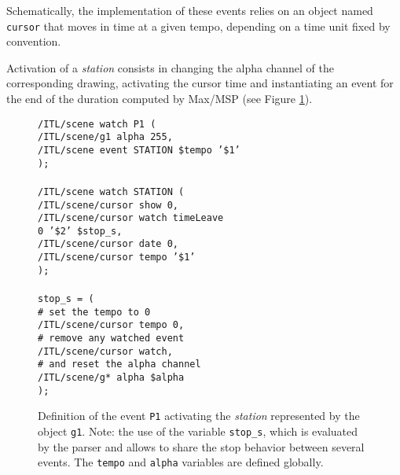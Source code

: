 \documentclass{article}
\newcommand{\OSC}[1]	{{\fontsize{8.5pt}{8pt} \selectfont\texttt{#1}}}
\newcommand{\tab}{\hspace*{4mm}}
\newcommand{\sample}[1]		{\vspace{-0.2em}\begin{center}\colorbox{mygrey}{\begin{minipage}[t]{0.98\columnwidth} {\small \texttt{#1}}\end{minipage}}\end{center}}
\begin{document}
Schematically, the implementation of these events relies on an object named \OSC{cursor} that moves in time at a given tempo, depending on a time unit fixed by convention.

Activation of a \emph{station} consists in changing the alpha channel of the corresponding drawing, activating the cursor time and instantiating an event for the end of the duration computed by Max/MSP (see Figure \ref{fig:station}).
\begin{figure}[h]
   \centering
\sample{/ITL/scene watch P1 ( \\
\tab/ITL/scene/g1 alpha 255, \\
\tab/ITL/scene event STATION \$tempo '\$1' \\
); \\
\\
/ITL/scene watch STATION ( \\
\tab/ITL/scene/cursor show 0,\\
\tab/ITL/scene/cursor watch timeLeave \\
\hspace*{30mm}0 '\$2' \$stop\_s,\\
\tab/ITL/scene/cursor date 0,\\
\tab/ITL/scene/cursor tempo '\$1'\\
); \\
\\
stop\_s = ( \\
\tab\# set the tempo to 0 \\
\tab/ITL/scene/cursor tempo 0, \\
\tab\# remove any watched event \\
\tab/ITL/scene/cursor watch,  \\
\tab\# and reset the alpha channel \\
\tab/ITL/scene/g* alpha \$alpha \\
);
}
   \caption{Definition of the event \OSC{P1} activating the \emph{station} represented by the object \OSC{g1}. Note: the use of the variable \OSC{stop\_s}, which is evaluated by the parser and allows to share the stop behavior between several events. The \OSC{tempo} and \OSC{alpha} variables are defined globally.}
   \label{fig:station}
\end{figure}
\end{document}

